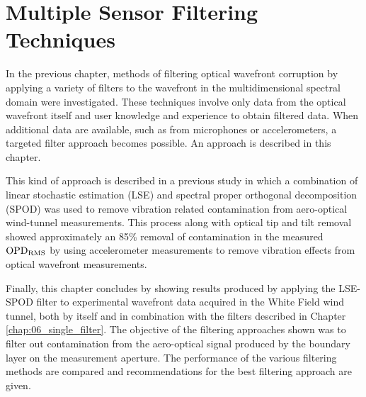 
\chapter{Multiple Sensor Filtering Techniques}
\label{chap:07_multiple_filter}


In the previous chapter, methods of filtering optical wavefront corruption by applying a variety of filters to the wavefront in the multidimensional spectral domain were investigated.
These techniques involve only data from the optical wavefront itself and user knowledge and experience to obtain filtered data.
When additional data are available, such as from microphones or accelerometers, a targeted filter approach becomes possible.
An approach is described in this chapter.


This kind of approach is described in a previous study \cite{DeLucca-2014-RAJvGdv7} in which a combination of linear stochastic estimation (LSE) and spectral proper orthogonal decomposition (SPOD) was used to remove vibration related contamination from aero-optical wind-tunnel measurements.
This process along with optical tip and tilt removal showed approximately an 85\% removal of contamination in the measured $\operatorname{OPD_{RMS}}$ by using accelerometer measurements to remove vibration effects from optical wavefront measurements.

Finally, this chapter concludes by showing results produced by applying the LSE-SPOD filter to experimental wavefront data acquired in the White Field wind tunnel, both by itself and in combination with the filters described in Chapter \ref{chap:06_single_filter}. The objective of the filtering approaches shown was to filter out contamination from the aero-optical signal produced by the boundary layer on the measurement aperture. The performance of the various filtering methods are compared and recommendations for the best filtering approach are given.

